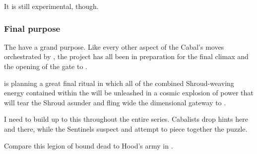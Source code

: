 It is still experimental, though. 





\subsubsection{Final purpose}
The {\Sephiroth} have a grand purpose. Like every other aspect of the Cabal's moves orchestrated by , the \sephirah{} project has all been in preparation for the final climax and the opening of the gate to . 

\Daggerrain{} is planning a great final ritual in which all of the combined Shroud-weaving energy contained within the \Sephiroth{} will be unleashed in a cosmic explosion of \vertex{} power that will tear the Shroud asunder and fling wide the dimensional gateway to \Erebos.

I need to build up to this throughout the entire series. Cabalists drop hints here and there, while the Sentinels suspect and attempt to piece together the puzzle.

Compare this legion of bound dead to Hood's army in \cite{StevenErikson:TolltheHounds}. 







